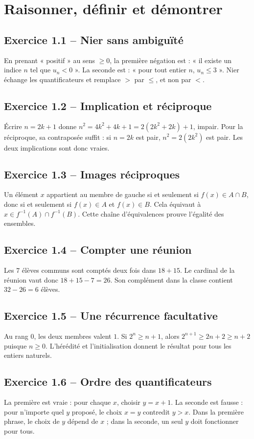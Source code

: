 \chapter{Raisonner, définir et démontrer}
\section*{Exercice 1.1 -- Nier sans ambiguïté}
En prenant « positif » au sens $\ge0$, la première négation est : « il existe un indice $n$ tel que $u_n<0$ ». La seconde est : « pour tout entier $n$, $u_n\le3$ ». Nier échange les quantificateurs et remplace $>$ par $\le$, et non par $<$.

\section*{Exercice 1.2 -- Implication et réciproque}
Écrire $n=2k+1$ donne $n^2=4k^2+4k+1=2(2k^2+2k)+1$, impair. Pour la réciproque, sa contraposée suffit : si $n=2k$ est pair, $n^2=2(2k^2)$ est pair. Les deux implications sont donc vraies.

\section*{Exercice 1.3 -- Images réciproques}
Un élément $x$ appartient au membre de gauche si et seulement si $f(x)\in A\cap B$, donc si et seulement si $f(x)\in A$ et $f(x)\in B$. Cela équivaut à $x\in f^{-1}(A)\cap f^{-1}(B)$. Cette chaîne d'équivalences prouve l'égalité des ensembles.

\section*{Exercice 1.4 -- Compter une réunion}
Les $7$ élèves communs sont comptés deux fois dans $18+15$. Le cardinal de la réunion vaut donc $18+15-7=26$. Son complément dans la classe contient $32-26=6$ élèves.

\section*{Exercice 1.5 -- Une récurrence facultative}
Au rang $0$, les deux membres valent $1$. Si $2^n\ge n+1$, alors $2^{n+1}\ge2n+2\ge n+2$ puisque $n\ge0$. L'hérédité et l'initialisation donnent le résultat pour tous les entiers naturels.

\section*{Exercice 1.6 -- Ordre des quantificateurs}
La première est vraie : pour chaque $x$, choisir $y=x+1$. La seconde est fausse : pour n'importe quel $y$ proposé, le choix $x=y$ contredit $y>x$. Dans la première phrase, le choix de $y$ dépend de $x$ ; dans la seconde, un seul $y$ doit fonctionner pour tous.
